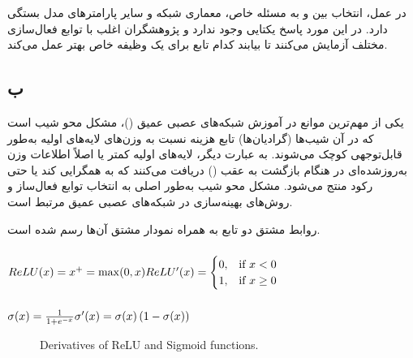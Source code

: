 \documentclass{article}
\begin{document}
در عمل، انتخاب بین  و  به مسئله خاص، معماری شبکه و سایر پارامترهای مدل بستگی دارد. در این مورد پاسخ یکتایی وجود ندارد و پژوهشگران اغلب با توابع فعال‌سازی مختلف آزمایش می‌کنند تا بیابند کدام تابع برای یک وظیفه خاص بهتر عمل می‌کند.

\subsection{ب}
یکی از مهم‌ترین موانع در آموزش شبکه‌های عصبی عمیق ()، مشکل محو شیب است که در آن شیب‌ها (گرادیان‌ها) تابع هزینه نسبت به وزن‌های لایه‌های اولیه به‌طور قابل‌توجهی کوچک می‌شوند. به عبارت دیگر، لایه‌های اولیه کمتر یا اصلاً اطلاعات وزن به‌روزشده‌ای در هنگام بازگشت به عقب () دریافت می‌کنند که به همگرایی کند یا حتی رکود منتج می‌شود. مشکل محو شیب به‌طور اصلی به انتخاب توابع فعال‌ساز و روش‌های بهینه‌سازی در شبکه‌های عصبی عمیق مرتبط است.

روابط مشتق دو تابع به همراه نمودار مشتق آن‌ها رسم شده است.

\begin{latin}
\subsubsection{}
$
ReLU(x) = x ^ + = \max(0, x)\\
ReLU'(x) =
\begin{cases}
0, & \text{if } x < 0 \\
1, & \text{if } x \geq 0
\end{cases}
$
\subsubsection{}
$
\sigma(x) = \frac{1}{1 + e ^ {-x}} \\
\sigma'(x) = \sigma(x) \left( 1 - \sigma(x) \right)
$
\begin{figure}[htbp]
\centering
{}
\caption{Derivatives of ReLU and Sigmoid functions.}
\end{figure}
\end{latin}
\end{document}
